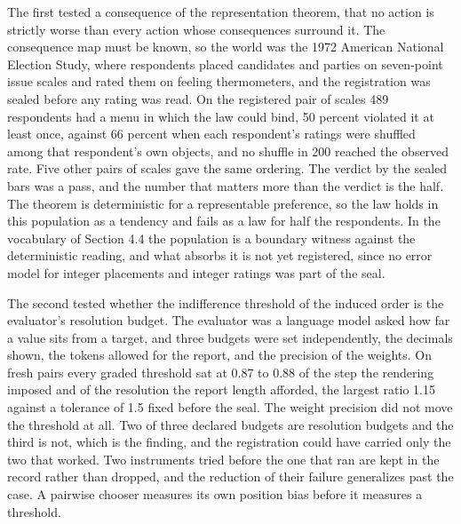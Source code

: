 \documentclass[11pt]{article}
\theoremstyle{remark}
\begin{document}
The first tested a consequence of the representation theorem, that no action is
strictly worse than every action whose consequences surround it. The consequence
map must be known, so the world was the 1972 American National Election Study,
where respondents placed candidates and parties on seven-point issue scales and
rated them on feeling thermometers, and the registration was sealed before any
rating was read. On the registered pair of scales 489 respondents had a menu in
which the law could bind, 50 percent violated it at least once, against 66 percent
when each respondent's ratings were shuffled among that respondent's own objects,
and no shuffle in 200 reached the observed rate. Five other pairs of scales gave
the same ordering. The verdict by the sealed bars was a pass, and the number that
matters more than the verdict is the half. The theorem is deterministic for a
representable preference, so the law holds in this population as a tendency and
fails as a law for half the respondents. In the vocabulary of Section 4.4 the
population is a boundary witness against the deterministic reading, and what
absorbs it is not yet registered, since no error model for integer placements and
integer ratings was part of the seal.

The second tested whether the indifference threshold of the induced order is the
evaluator's resolution budget. The evaluator was a language model asked how far a
value sits from a target, and three budgets were set independently, the decimals
shown, the tokens allowed for the report, and the precision of the weights. On
fresh pairs every graded threshold sat at 0.87 to 0.88 of the step the rendering
imposed and of the resolution the report length afforded, the largest ratio 1.15
against a tolerance of 1.5 fixed before the seal. The weight precision did not move
the threshold at all. Two of three declared budgets are resolution budgets and the
third is not, which is the finding, and the registration could have carried only
the two that worked. Two instruments tried before the one that ran are kept in the
record rather than dropped, and the reduction of their failure generalizes past the
case. A pairwise chooser measures its own position bias before it measures a
threshold.
\end{document}
